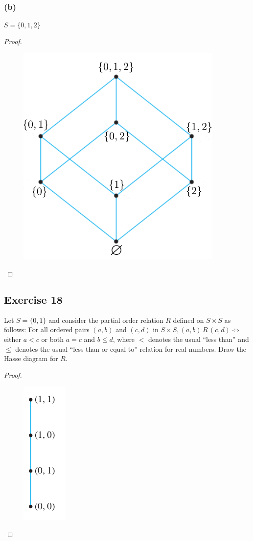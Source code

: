 \documentclass[14pt]{extarticle}
\begin{document}
\subsubsection{(b)}
\(S = \{0, 1, 2\}\)

\begin{proof}
        \begin{figure}[ht!]
                \centering
                \includegraphics[scale=0.4]{../images/8.5.17.b.png}
        \end{figure}
\end{proof}

\subsection{Exercise 18}
Let \(S = \{0, 1\}\) and consider the partial order relation $R$ defined on \(S \times S\) as follows: For all
ordered pairs \((a, b)\) and \((c, d)\) in \(S \times S, (a, b) \,R\, (c, d) \iff\) either \(a <c\) or both \(a= c\)
and \(b \leq d\), where \(<\) denotes the usual “less than” and \(\leq\) denotes the usual “less than or equal to”
relation for real numbers. Draw the Hasse diagram for $R$.

\begin{proof}
        \begin{figure}[ht!]
                \centering
                \includegraphics[scale=0.4]{../images/8.5.18.png}
        \end{figure}
\end{proof}
\end{document}
